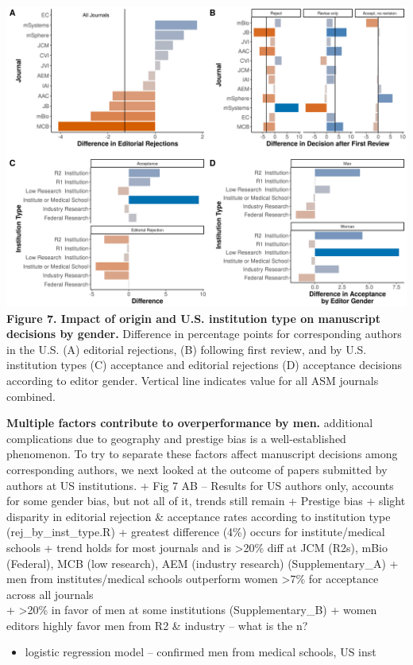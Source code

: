 \documentclass[11pt,]{article}
\providecommand{\tightlist}{%
  \setlength{\itemsep}{0pt}\setlength{\parskip}{0pt}}
\begin{document}
\includegraphics{Figure_7.png} \textbf{Figure 7. Impact of origin and
U.S. institution type on manuscript decisions by gender.} Difference in
percentage points for corresponding authors in the U.S. (A) editorial
rejections, (B) following first review, and by U.S. institution types
(C) acceptance and editorial rejections (D) acceptance decisions
according to editor gender. Vertical line indicates value for all ASM
journals combined.

\textbf{Multiple factors contribute to overperformance by men.}
additional complications due to geography and prestige bias is a
well-established phenomenon. To try to separate these factors affect
manuscript decisions among corresponding authors, we next looked at the
outcome of papers submitted by authors at US institutions. + Fig 7 AB --
Results for US authors only, accounts for some gender bias, but not all
of it, trends still remain + Prestige bias + slight disparity in
editorial rejection \& acceptance rates according to institution type
(rej\_by\_inst\_type.R) + greatest difference (4\%) occurs for
institute/medical schools + trend holds for most journals and is
\textgreater{}20\% diff at JCM (R2s), mBio (Federal), MCB (low
research), AEM (industry research) (Supplementary\_A) + men from
institutes/medical schools outperform women \textgreater{}7\% for
acceptance across all journals\\
+ \textgreater{}20\% in favor of men at some institutions
(Supplementary\_B) + women editors highly favor men from R2 \& industry
-- what is the n?

\begin{itemize}
\tightlist
\item
  logistic regression model -- confirmed men from medical schools, US
  inst
\end{itemize}
\end{document}
